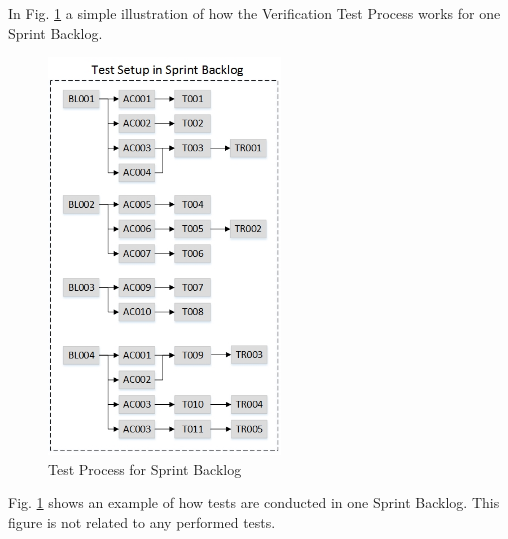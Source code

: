 \newpage
In Fig. \ref{fig:testsetup2} a simple illustration of how the Verification Test Process works for one Sprint Backlog. 

\begin{figure}[h]
    \centering
        \includegraphics[width=0.55\textwidth]{VAPIQ-PICTURES/testdocbild2}
        \caption{Test Process for Sprint Backlog}
        \label{fig:testsetup2}
\end{figure}
\noindent
Fig. \ref{fig:testsetup2} shows an example of how tests are conducted in one Sprint Backlog. This figure is not related to any performed tests.\\
\newpage
